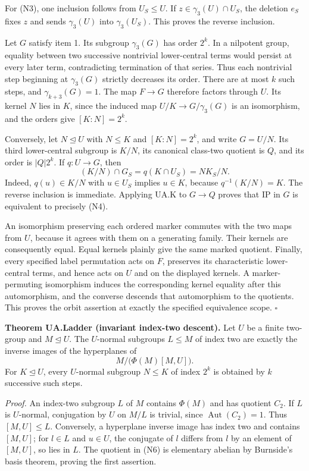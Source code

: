 For (N3), one inclusion follows from \(U_S\leq U\). If
\(z\in\gamma_3(U)\cap U_S\), the deletion \(e_S\) fixes \(z\) and sends
\(\gamma_3(U)\) into \(\gamma_3(U_S)\). This proves the reverse
inclusion.

Let \(G\) satisfy item 1. Its subgroup \(\gamma_3(G)\) has order
\(2^k\). In a nilpotent group, equality between two successive
nontrivial lower-central terms would persist at every later term,
contradicting termination of that series. Thus each nontrivial step
beginning at \(\gamma_3(G)\) strictly decreases its order. There are at
most \(k\) such steps, and \(\gamma_{k+3}(G)=1\). The map \(F\to G\)
therefore factors through \(U\). Its kernel \(N\) lies in \(K\), since
the induced map \(U/K\to G/\gamma_3(G)\) is an isomorphism, and the
orders give \([K:N]=2^k\).

Conversely, let \(N\unlhd U\) with \(N\leq K\) and \([K:N]=2^k\), and
write \(G=U/N\). Its third lower-central subgroup is \(K/N\), its
canonical class-two quotient is \(Q\), and its order is \(|Q|2^k\). If
\(q:U\to G\), then \[
(K/N)\cap G_S=q(K\cap U_S)=NK_S/N.
\tag{N5}
\] Indeed, \(q(u)\in K/N\) with \(u\in U_S\) implies \(u\in K\), because
\(q^{-1}(K/N)=K\). The reverse inclusion is immediate. Applying UA.K to
\(G\to Q\) proves that IP in \(G\) is equivalent to precisely (N4).

An isomorphism preserving each ordered marker commutes with the two maps
from \(U\), because it agrees with them on a generating family. Their
kernels are consequently equal. Equal kernels plainly give the same
marked quotient. Finally, every specified label permutation acts on
\(F\), preserves its characteristic lower-central terms, and hence acts
on \(U\) and on the displayed kernels. A marker-permuting isomorphism
induces the corresponding kernel equality after this automorphism, and
the converse descends that automorphism to the quotients. This proves
the orbit assertion at exactly the specified equivalence scope.
\(\square\)

\textbf{Theorem UA.Ladder (invariant index-two descent).} Let \(U\) be a
finite two-group and \(M\unlhd U\). The \(U\)-normal subgroups
\(L\leq M\) of index two are exactly the inverse images of the
hyperplanes of \[
M/\bigl(\Phi(M)[M,U]\bigr).
\tag{N6}
\] For \(K\unlhd U\), every \(U\)-normal subgroup \(N\leq K\) of index
\(2^k\) is obtained by \(k\) successive such steps.

\emph{Proof.} An index-two subgroup \(L\) of \(M\) contains \(\Phi(M)\)
and has quotient \(C_2\). If \(L\) is \(U\)-normal, conjugation by \(U\)
on \(M/L\) is trivial, since \(\operatorname{Aut}(C_2)=1\). Thus
\([M,U]\leq L\). Conversely, a hyperplane inverse image has index two
and contains \([M,U]\); for \(l\in L\) and \(u\in U\), the conjugate of
\(l\) differs from \(l\) by an element of \([M,U]\), so lies in \(L\).
The quotient in (N6) is elementary abelian by Burnside's basis theorem,
proving the first assertion.

